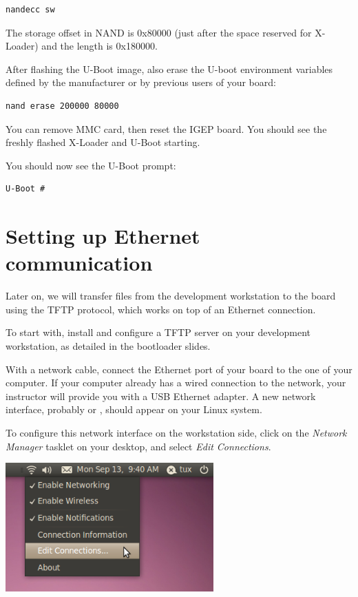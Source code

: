 \begin{verbatim}
nandecc sw
\end{verbatim}

The storage offset in NAND is 0x80000 (just after
the space reserved for X-Loader) and the length is 0x180000.

After flashing the U-Boot image, also erase the U-boot environment
variables defined by the manufacturer or by previous users of your
board:

\begin{verbatim}
nand erase 200000 80000
\end{verbatim}

You can remove MMC card, then reset the IGEP board. You should see the
freshly flashed X-Loader and U-Boot starting.

You should now see the U-Boot prompt:

\begin{verbatim}
U-Boot #
\end{verbatim}

\section{Setting up Ethernet communication}

Later on, we will transfer files from the development workstation to
the board using the TFTP protocol, which works on top of an Ethernet
connection.

To start with, install and configure a TFTP server on your development
workstation, as detailed in the bootloader slides.

With a network cable, connect the Ethernet port of your board to the
one of your computer. If your computer already has a wired connection
to the network, your instructor will provide you with a USB Ethernet
adapter. A new network interface, probably  or ,
should appear on your Linux system.

To configure this network interface on the workstation side, click on
the {\em Network Manager} tasklet on your desktop, and select {\em
  Edit Connections}.

\begin{center}
\includegraphics[width=8cm]{labs/sysdev-u-boot/network-config-1.png}
\end{center}

